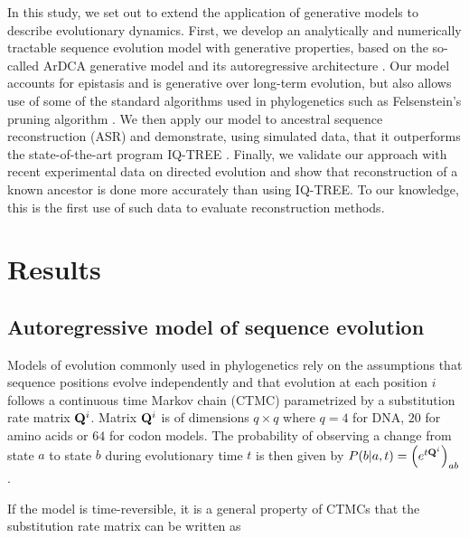 In this study, we set out to extend the application of generative models to describe evolutionary dynamics. 
First, we develop an analytically and numerically tractable sequence evolution model with generative properties, based on the so-called ArDCA generative model and its autoregressive architecture \cite{trinquier_efficientgenerativemodeling_2021}. 
Our model accounts for epistasis and is generative over long-term evolution, but also allows use of some of the standard algorithms used in phylogenetics such as Felsenstein's pruning algorithm \cite{felsensteinjoseph_inferringphylogenies_2003}. 
We then apply our model to ancestral sequence reconstruction (ASR) and demonstrate, using simulated data, that it outperforms the state-of-the-art program IQ-TREE \cite{minh_iqtreenewmodels_2020}. 
Finally, we validate our approach with recent experimental data on directed evolution and show that reconstruction of a known ancestor is done more accurately than using IQ-TREE. 
To our knowledge, this is the first use of such data to evaluate reconstruction methods.

\section{Results} %
\label{sub:results}

\subsection{Autoregressive model of sequence evolution} 
\label{sub:autoregressive_sequence_evolution_model}

Models of evolution commonly used in phylogenetics rely on the assumptions that sequence positions evolve independently and that evolution at each position $i$ follows a continuous time Markov chain (CTMC) parametrized by a substitution rate matrix $\mathbf{Q}^i$. 
Matrix $\mathbf{Q}^i$ is of dimensions $q \times q$ where $q=4$ for DNA, $20$ for amino acids or $64$ for codon models.
The probability of observing a change from state $a$ to state $b$ during evolutionary time $t$ is then given by $P(b \vert a, t) = \left( e^{t\mathbf{Q}^i} \right)_{ab}$.

If the model is time-reversible, it is a general property of CTMCs that the substitution rate matrix can be written as 

